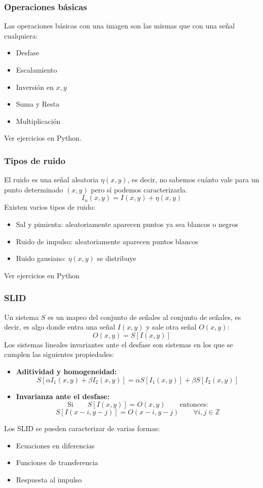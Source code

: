 \begin{frame}\frametitle{Operaciones básicas}
  Las operaciones básicas con una imagen son las mismas que con una señal cualquiera:
  \begin{itemize}
  \item Desfase
  \item Escalamiento
  \item Inversión en $x,y$
  \item Suma y Resta 
  \item Multiplicación
  \end{itemize}
  Ver ejercicios en Python.
\end{frame}

\begin{frame}\frametitle{Tipos de ruido}
  El ruido es una señal aleatoria $\eta(x,y)$, es decir, no sabemos cuánto vale para un punto determinado $(x,y)$ pero sí podemos caracterizarla.
  \[I_n(x,y) = I(x,y) + \eta(x,y)\]
  Existen varios tipos de ruido:
  \begin{itemize}
  \item Sal y pimienta: aleatoriamente aparecen puntos ya sea blancos o negros
  \item Ruido de impulso: aleatoriamente aparecen puntos blancos
  \item Ruido gausiano: $\eta(x,y)$ se distribuye 
  \end{itemize}
  Ver ejercicios en Python
\end{frame}

\begin{frame}\frametitle{SLID}
  Un sistema $S$ es un mapeo del conjunto de señales al conjunto de señales, es decir, es algo donde entra una señal $I(x,y)$ y sale otra señal $O(x,y)$:
  \[O(x,y) = S[I(x,y)]\]
  Los sistemas lineales invariantes ante el desfase son sistemas en los que se cumplen las siguientes propiedades:
  \begin{itemize}
  \item \textbf{Aditividad y homogeneidad:}
    \[S[\alpha I_1(x,y) + \beta I_2(x,y)] = \alpha S[I_1(x,y)] + \beta S[I_2(x,y)]\]
  \item \textbf{Invarianza ante el desfase:}
    \[\textrm{Si} \qquad S[I(x,y)] = O(x,y) \qquad\textrm{entonces:}\]
    \[S[I(x-i, y-j)] = O(x-i, y-j) \qquad \forall i,j \in \mathbb{Z}\]
  \end{itemize}
  Los SLID se pueden caracterizar de varias formas:
  \begin{itemize}
  \item Ecuaciones en diferencias
  \item Funciones de transferencia
  \item Respuesta al impulso
  \end{itemize}
\end{frame}

